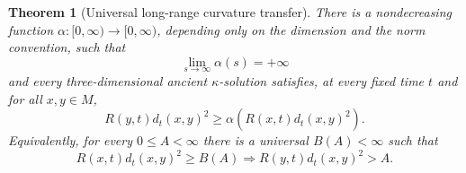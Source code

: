 \documentclass[10pt]{coll-l}
\newtheorem{theorem}{Theorem}[chapter]
\theoremstyle{definition}
\theoremstyle{remark}
\numberwithin{section}{chapter}
\numberwithin{equation}{chapter}
\begin{document}
\begin{theorem}[Universal long-range curvature transfer]
\label{thm:ncs-long-range-curvature}
There is a nondecreasing function
$\alpha:[0,\infty)\to[0,\infty)$, depending only on the dimension and the
norm convention, such that
\begin{equation}
                  \lim_{s\to\infty}\alpha(s)=+\infty                 \label{eq:ncs-alpha-proper}
\end{equation}
and every three-dimensional ancient $\kappa$-solution satisfies, at every
fixed time $t$ and for all $x,y\in M$,
\begin{equation}
 R(y,t)d_t(x,y)^2
       \geq\alpha\!\left(R(x,t)d_t(x,y)^2\right).      \label{eq:ncs-long-range-transfer}
\end{equation}
Equivalently, for every $0\leq A<\infty$ there is a universal $B(A)<\infty$
such that
\begin{equation}
 R(x,t)d_t(x,y)^2\geq B(A)
       \Longrightarrow R(y,t)d_t(x,y)^2>A.             \label{eq:ncs-long-range-threshold}
\end{equation}
\end{theorem}
\end{document}
